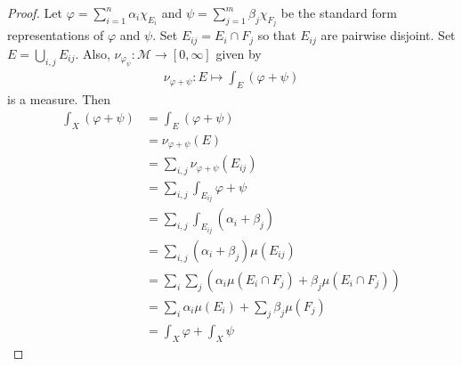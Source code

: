 \documentclass[11pt]{amsart}
\theoremstyle{definition}
\numberwithin{equation}{section}
\begin{document}
\begin{proof}
    Let $\varphi=\sum_{i=1}^n\alpha_i\chi_{E_i}$ and $\psi=\sum_{j=1}^m\beta_j\chi_{F_j}$ be the standard form representations of $\varphi$ and $\psi$. Set $E_{ij}=E_i\cap F_j$ so that $E_{ij}$ are pairwise disjoint. Set $E=\bigcup_{i,j}E_{ij}$. Also, $\nu_{\varphi_\psi}:\mathcal M\to[0,\infty]$ given by 
    \begin{align*}
        \nu_{\varphi+\psi}:E\mapsto\int_E(\varphi+\psi)
    \end{align*}
    is a measure. Then
    \begin{align*}
        \int_X(\varphi+\psi)&=\int_E(\varphi+\psi)\\
        &=\nu_{\varphi+\psi}(E)\\
        &=\sum_{i,j}\nu_{\varphi+\psi}(E_{ij})\\
        &=\sum_{i,j}\int_{E_{ij}}\varphi+\psi\\
        &=\sum_{i,j}\int_{E_{ij}}(\alpha_i+\beta_j)\\
        &=\sum_{i,j}(\alpha_i+\beta_j)\mu(E_{ij})\\
        &=\sum_{i}\sum_{j}(\alpha_i\mu(E_i\cap F_j)+\beta_j\mu(E_i\cap F_j))\\
        &=\sum_i\alpha_i\mu(E_i)+\sum_j\beta_j\mu(F_j)\\
        &=\int_X\varphi+\int_X\psi
    \end{align*}
\end{proof}
\end{document}
